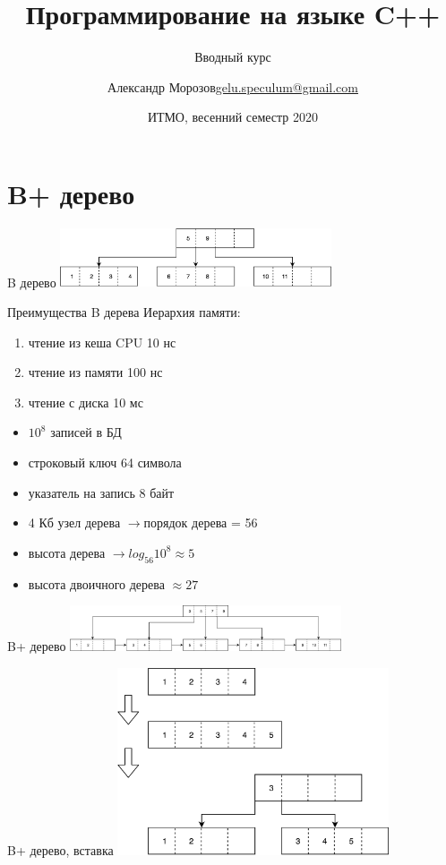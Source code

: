 \documentclass[unknownkeysallowed,xcolor=table]{beamer}
\title[C++]
{Программирование на языке C++}
\subtitle{Вводный курс}
\author[А.~Б.~Морозов]
{
  \texorpdfstring{Александр Морозов\newline\href{mailto:gelu.speculum@gmail.com}{gelu.speculum@gmail.com}}
  {Александр Морозов}
}
\date[ITMO 2020]
{ИТМО, весенний семестр 2020}
\newcommand{\textapprox}{\raisebox{0.5ex}{\texttildelow}}
\newcommand{\rarr}{$\rightarrow$}
\begin{document}
\frame{\titlepage}


\section{B+ дерево}

\begin{frame}{B дерево}
  \includegraphics[align=c,width=8cm,keepaspectratio]{images/btree.png}
\end{frame}

\begin{frame}{Преимущества B дерева}
  Иерархия памяти:
  \begin{enumerate}
    \item чтение из кеша CPU \textapprox 10 нс
    \item чтение из памяти \textapprox 100 нс
    \item чтение с диска \textapprox 10 мс
  \end{enumerate}
  \vspace{2em}
  \begin{itemize}
    \item $10^8$ записей в БД
    \item строковый ключ 64 символа
    \item указатель на запись 8 байт
    \item 4 Кб узел дерева \rarr порядок дерева = 56
    \item высота дерева \rarr $log_{56} 10^8 \approx 5$
    \item высота двоичного дерева $\approx 27$
  \end{itemize}
\end{frame}

\begin{frame}{B+ дерево}
  \includegraphics[align=c,width=8cm,keepaspectratio]{images/bptree.png}
\end{frame}

\begin{frame}{B+ дерево, вставка}
  \includegraphics[align=c,width=8cm,keepaspectratio]{images/bptree_insert.png}
\end{frame}
\end{document}
